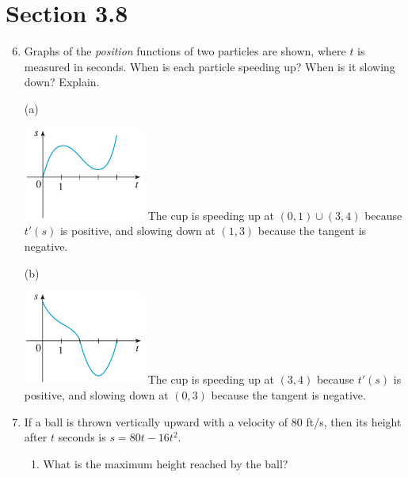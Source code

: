 \documentclass{article}
\begin{document}
\section{Section 3.8}
\begin{enumerate}
\setcounter{enumi}{5}
	\item Graphs of the \textit{position} functions of two particles are shown, where $t$ is measured in seconds. When is each particle speeding up? When is it slowing down? Explain.
	\begin{center}
		\begin{minipage}{0.05\linewidth}\vspace{0pt}
		(a)	
		\end{minipage}
		\begin{minipage}{0.4\linewidth}
			\includegraphics[width=4cm]{images/37pr6a.png}\newline
			The cup is speeding up at $(0,1)\cup(3,4)$ because $t'(s)$ is positive, and slowing down at $(1,3)$ because the tangent is negative.
		\end{minipage}
		\begin{minipage}{0.05\linewidth}
		(b)	
		\end{minipage}
		\begin{minipage}{0.4\linewidth}
			\includegraphics[width=4cm]{images/37pr6b.png}\newline
			The cup is speeding up at $(3,4)$ because $t'(s)$ is positive, and slowing down at $(0,3)$ because the tangent is negative.
		\end{minipage}
	\end{center}
\setcounter{enumi}{9}
	\item If a ball is thrown vertically upward with a velocity of 80 ft/s, then its height after $t$ seconds is $s=80t-16t^2$.
		\begin{enumerate}
			\item What is the maximum height reached by the ball?

\end{enumerate}
\end{enumerate}
\end{document}
